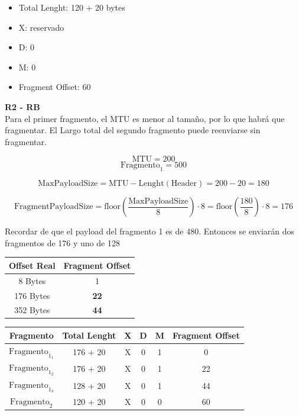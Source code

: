 \begin{itemize}
    \item Total Lenght: 120 + 20 bytes
    \item X: reservado
    \item D: 0
    \item M: 0
    \item Fragment Offset: 60
\end{itemize}


\textbf{R2 - RB}\\

Para el primer fragmento, el MTU es menor al tamaño, por lo que habrá que fragmentar. El Largo total del segundo fragmento puede reenviarse sin fragmentar.


$$ \mathrm{MTU} = 200 $$
$$ \mathrm{Fragmento}_1 = 500 $$

$$ \mathrm{MaxPayloadSize} = \mathrm{MTU} - \mathrm{Lenght}(\mathrm{Header}) = 200 - 20 = 180 $$

$$ \mathrm{FragmentPayloadSize} = \mathrm{floor}(\frac{\mathrm{MaxPayloadSize}}{8}) \cdot 8 = \mathrm{floor}(\frac{\mathrm{180}}{8}) \cdot 8  = 176 $$

Recordar de que el payload del fragmento 1 es de 480. Entonces se enviarán dos fragmentos de 176 y uno de 128

\begin{center}
    \begin{tabular}{c|c}
        Offset Real & Fragment Offset \\
        \hline
        \hline
        8 Bytes & 1 \\
        \hline
        176 Bytes & \textbf{22} \\
        \hline
        352 Bytes & \textbf{44}
    \end{tabular}
\end{center}

\begin{center}
    \begin{tabular}{c|c|c|c|c|c}
    Fragmento & Total Lenght & X & D & M & Fragment Offset \\
        \hline
        \hline
    $ \mathrm{Fragmento}_{1_1} $  &  176 + 20  & X & 0 & 1 & 0   \\
    \hline
    $ \mathrm{Fragmento}_{1_2} $  &  176 + 20  & X & 0 & 1 & 22 \\
    \hline
    $ \mathrm{Fragmento}_{1_3} $ &  128 + 20  & X & 0 & 1 & 44 \\
    \hline
    $ \mathrm{Fragmento}_{2} $  & 120 + 20 & X & 0 & 0 & 60
    \end{tabular}
\end{center}

